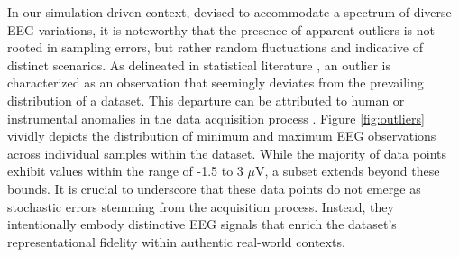 \documentclass[a4paper, UKenglish, 11pt]{uiomaster}
\begin{document}
In our simulation-driven context, devised to accommodate a spectrum of diverse EEG variations, it is noteworthy that the presence of apparent outliers is not rooted in sampling errors, but rather random fluctuations and indicative of distinct scenarios. As delineated in statistical literature \cite{barnett1994outliers}, an outlier is characterized as an observation that seemingly deviates from the prevailing distribution of a dataset. This departure can be attributed to human or instrumental anomalies in the data acquisition process \cite{zhang2015outlier}. Figure \ref{fig:outliers} vividly depicts the distribution of minimum and maximum EEG observations across individual samples within the dataset. While the majority of data points exhibit values within the range of -1.5 to 3 $\mu$V, a subset extends beyond these bounds. It is crucial to underscore that these data points do not emerge as stochastic errors stemming from the acquisition process. Instead, they intentionally embody distinctive EEG signals that enrich the dataset's representational fidelity within authentic real-world contexts.
\end{document}

